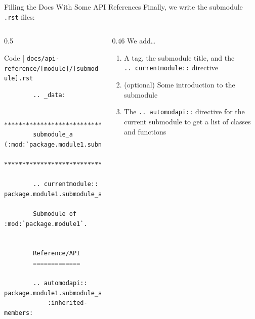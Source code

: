 \begin{frame}[fragile]{Filling the Docs With Some API References}
  Finally, we write the submodule \texttt{.rst} files:

  \begin{columns}[onlytextwidth]
    \begin{column}{0.5\textwidth}
      \begin{block}{Code | \texttt{docs/api-reference/[module]/[submodule].rst}}
      \footnotesize
      \begin{verbatim}
        .. _data:

        ************************************************
        submodule_a (:mod:`package.module1.submodule_a`)
        ************************************************

        .. currentmodule:: package.module1.submodule_a

        Submodule of :mod:`package.module1`.


        Reference/API
        =============

        .. automodapi:: package.module1.submodule_a
            :inherited-members:
      \end{verbatim}
      \end{block}
    \end{column}
    \hfill
    \begin{column}{0.46\textwidth}
      We add\dots
      \begin{enumerate}
        \setlength{\itemsep}{1.5em}
        \item A tag, the submodule title, and the\\\texttt{.. currentmodule::} directive
        \item (optional) Some introduction to the submodule
        \item The \texttt{.. automodapi::} directive for the current submodule to get a list of
          classes and functions
      \end{enumerate}
    \end{column}
  \end{columns}
\end{frame}

